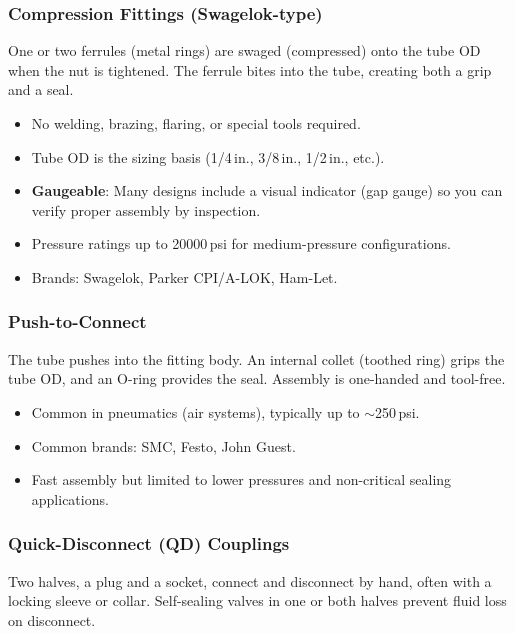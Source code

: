 \documentclass[11pt,letterpaper,twoside,openany]{book}
\begin{document}
\subsubsection{Compression Fittings (Swagelok-type)}

One or two ferrules (metal rings) are swaged (compressed) onto the tube OD when the nut is tightened. The ferrule bites into the tube, creating both a grip and a seal.

\begin{itemize}[nosep,leftmargin=1.5em]
  \item No welding, brazing, flaring, or special tools required.
  \item Tube OD is the sizing basis (1/4\,in., 3/8\,in., 1/2\,in., etc.).
  \item \textbf{Gaugeable}: Many designs include a visual indicator (gap gauge) so you can verify proper assembly by inspection.
  \item Pressure ratings up to 20000\,psi for medium-pressure configurations.
  \item Brands: Swagelok, Parker CPI/A-LOK, Ham-Let.
\end{itemize}

\subsubsection{Push-to-Connect}

The tube pushes into the fitting body. An internal collet (toothed ring) grips the tube OD, and an O-ring provides the seal. Assembly is one-handed and tool-free.

\begin{itemize}[nosep,leftmargin=1.5em]
  \item Common in pneumatics (air systems), typically up to $\sim$250\,psi.
  \item Common brands: SMC, Festo, John Guest.
  \item Fast assembly but limited to lower pressures and non-critical sealing applications.
\end{itemize}

\subsubsection{Quick-Disconnect (QD) Couplings}

Two halves, a plug and a socket, connect and disconnect by hand, often with a locking sleeve or collar. Self-sealing valves in one or both halves prevent fluid loss on disconnect.
\end{document}
